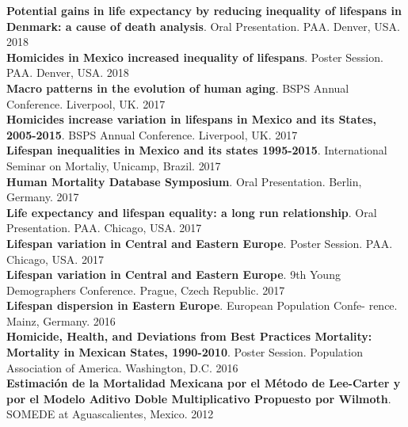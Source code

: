 \documentclass[12pt]{article}
\begin{document}
\textbf{Potential gains in life expectancy by reducing inequality of lifespans in Denmark: a cause of death analysis}. Oral Presentation. PAA. Denver, USA. \hfill { 2018}\\

\textbf{Homicides in Mexico increased inequality of lifespans}. Poster Session. PAA. Denver, USA. \hfill { 2018}\\

\textbf{Macro patterns in the evolution of human aging}. BSPS Annual Conference. Liverpool, UK. \hfill { 2017}\\

\textbf{Homicides increase variation in lifespans in Mexico and its States, 2005-2015}. BSPS Annual Conference. Liverpool, UK. \hfill { 2017}\\

\textbf{Lifespan inequalities in Mexico and its states 1995-2015}. International Seminar on Mortaliy, Unicamp, Brazil. \hfill { 2017}\\

\textbf{Human Mortality Database Symposium}. Oral Presentation. Berlin, Germany. \hfill { 2017}\\

\textbf{Life expectancy and lifespan equality: a long run relationship}. Oral Presentation. PAA. Chicago, USA. \hfill { 2017}\\

\textbf{Lifespan variation in Central and Eastern Europe}. Poster Session. PAA. Chicago, USA. \hfill { 2017}\\

\textbf{Lifespan variation in Central and Eastern Europe}. 9th Young Demographers Conference. Prague, Czech Republic. \hfill { 2017}\\

\textbf{Lifespan dispersion in Eastern Europe}. European Population Confe- rence. Mainz, Germany. \hfill { 2016}\\

\textbf{Homicide, Health, and Deviations from Best Practices Mortality: Mortality in Mexican States, 1990-2010}. Poster Session. Population Association of America. Washington, D.C. \hfill { 2016}\\


\textbf{Estimaci\'on de la Mortalidad Mexicana por el M\'etodo de Lee-Carter y por el Modelo Aditivo Doble Multiplicativo Propuesto por Wilmoth}. SOMEDE at Aguascalientes, Mexico. \hfill { 2012}\\
\end{document}
